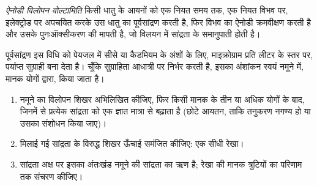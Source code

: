 \begin{definition}[ऐनोडी विलोपन वोल्टामिति]\label{def:b3:electrode-kinetics:stripping}
\emph{ऐनोडी विलोपन वोल्टामिति}
किसी धातु के आयनों को एक नियत समय तक, एक नियत विभव पर, इलेक्ट्रोड पर अपचयित करके
उस धातु का पूर्वसांद्रण करती है, फिर विभव का ऐनोडी क्रमवीक्षण करती है और उसके
पुनःऑक्सीकरण की  मापती है, जो विलयन में सांद्रता के
समानुपाती होती है।
\end{definition}

पूर्वसांद्रण इस विधि को पेयजल में सीसे या
कैडमियम के अंशों के लिए, माइक्रोग्राम प्रति लीटर के स्तर पर, पर्याप्त सुग्राही बना देता है। चूँकि
सुग्राहिता आधात्री पर निर्भर करती है, इसका अंशांकन स्वयं नमूने में,
मानक योगों द्वारा, किया जाता है।

\begin{method}[विलोपन के साथ मानक योग]\label{met:b3:electrode-kinetics:standard-addition}
\begin{enumerate}
  \item नमूने का विलोपन शिखर अभिलिखित कीजिए, फिर किसी मानक के तीन या अधिक
        योगों के बाद, जिनमें से प्रत्येक सांद्रता को एक ज्ञात मात्रा से बढ़ाता है
        (छोटे आयतन, ताकि तनुकरण नगण्य हो या उसका संशोधन किया जाए)।
  \item मिलाई गई सांद्रता के विरुद्ध शिखर ऊँचाई समंजित कीजिए: एक सीधी रेखा।
  \item सांद्रता अक्ष पर इसका अंतःखंड नमूने की सांद्रता का ऋण है;
        रेखा की मानक त्रुटियों का परिणाम तक संचरण कीजिए।
\end{enumerate}
\end{method}

